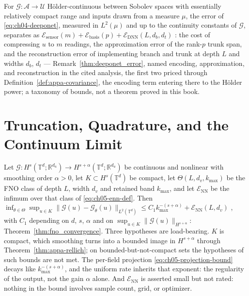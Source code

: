 \begin{remark}\label{thm:appa-deeponet-error}
For $\mathcal{G} : \mathcal{A} \to \mathcal{U}$ Hölder-continuous between Sobolev spaces
with essentially relatively compact range and inputs drawn from a measure $\mu$, the error of
\eqref{eq:ch04-deeponet}, measured in $L^2(\mu)$ and up to the continuity constants of
$\mathcal{G}$, separates as $\mathcal{E}_{\text{sensor}}(m) +
\mathcal{E}_{\text{basis}}(p) + \mathcal{E}_{\text{DNN}}(L, d_b, d_t)$
\cite{lanthaler2022error}:
the cost of compressing $u$ to $m$ readings, the approximation error of the rank-$p$ trunk
span, and the reconstruction error of implementing branch and trunk at depth $L$ and widths
$d_b$, $d_t$ ---
Remark~\ref{thm:deeponet_error}, named encoding, approximation, and reconstruction in the
cited analysis, the first two priced through Definition~\ref{def:appa-covariance}, the
encoding term entering there to the Hölder power; a taxonomy of bounds, not a theorem
proved in this book.
\end{remark}

\section{Truncation, Quadrature, and the Continuum Limit}

\begin{theorem}\label{thm:appa-fno-rate}
Let $\mathcal{G} : H^s(\mathbb{T}^d;\mathbb{R}^{d_a}) \to
H^{s+\alpha}(\mathbb{T}^d;\mathbb{R}^{d_u})$ be continuous and nonlinear with smoothing order
$\alpha > 0$, let $K \subset H^s(\mathbb{T}^d)$ be compact, let $\Theta(L,d_v,k_{\max})$ be the
FNO class of depth $L$, width $d_v$ and retained band $k_{\max}$, and let
$\mathcal{E}_{\text{NN}}$ be the infimum over that class of \eqref{eq:ch05-enn-def}. Then
$\inf_{\theta \in \Theta}\sup_{u \in K}\|\mathcal{G}(u) -
\mathcal{G}_\theta(u)\|_{L^2(\mathbb{T}^d)} \le C_1 k_{\max}^{-(s+\alpha)} +
\mathcal{E}_{\text{NN}}(L,d_v)$ \cite{kovachki2021universal}, with $C_1$ depending on $d$,
$s$, $\alpha$ and on $\sup_{u\in K}\|\mathcal{G}(u)\|_{H^{s+\alpha}}$:
Theorem~\ref{thm:fno_convergence}.
Three hypotheses are load-bearing. $K$ is compact, which smoothing turns into a bounded
image in $H^{s+\alpha}$ through Theorem~\ref{thm:appa-rellich}; on bounded-but-not-compact
sets the hypotheses of such bounds are not met. The
per-field projection \eqref{eq:ch05-projection-bound} decays like $k_{\max}^{-(s+\alpha)}$,
and the uniform rate inherits that exponent: the regularity of the output, not the gain
$\alpha$ alone. And $\mathcal{E}_{\text{NN}}$ is asserted small but not rated: nothing in
the bound involves sample count, grid, or optimizer.
\end{theorem}

